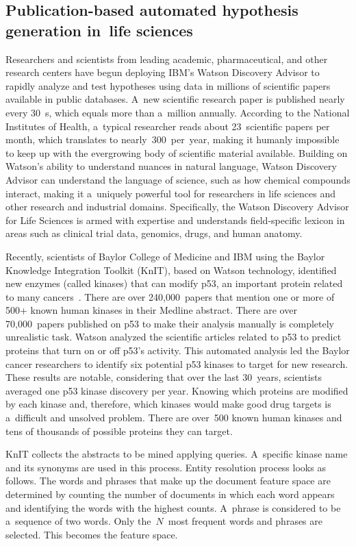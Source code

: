 \begin{multicols}{2}
\subsection{Publication-based automated hypothesis generation in~life sciences}

  \noindent
  Researchers and scientists from leading academic, pharmaceutical, and other
research centers have begun deploying  IBM's  Watson Discovery Advisor to rapidly
analyze and test hypotheses using data in millions of scientific papers available in
public databases. A~new scientific research paper is published nearly every
30~s, which equals more than a~million annually. According to the National
Institutes of Health, a~typical researcher reads about 23~scientific papers per month,
which translates to nearly~300~per~year, making it humanly impossible to keep up
with the evergrowing body of scientific material available. Building on Watson's
ability to understand nuances in natural language, Watson Discovery Advisor can
understand the language of science, such as how chemical compounds interact,
making it a~uniquely powerful tool for researchers in life sciences and other research
and industrial domains.  Specifically, the Watson Discovery Advisor for Life Sciences
is armed with expertise and understands field-specific lexicon in areas such as
clinical trial data, genomics, drugs, and human anatomy.

  Recently, scientists of Baylor College of Medicine and IBM using the Baylor
Knowledge Integration Toolkit (KnIT), based on Watson technology, identified new
enzymes (called kinases) that can modify p53, an important protein related to many
cancers~\cite{77-kl}. There are over 240,000~papers that mention one or more of
500+ known human kinases in their Medline abstract. There are over 70,000~papers
published on p53 to make their analysis manually is completely unrealistic task.
Watson analyzed the scientific articles related to p53 to predict proteins that turn on
or off p53's activity. This automated analysis led the Baylor cancer researchers to
identify six potential p53 kinases to target for new research. These results are notable,
considering that over the last 30~years, scientists averaged one p53 kinase discovery
per year. Knowing which proteins are modified by each kinase and, therefore, which
kinases would make good drug targets is a~difficult and unsolved problem. There are
over~500 known human kinases and tens of thousands of possible proteins they can
target.

  KnIT collects the abstracts to be mined applying queries. A~specific kinase name
and its synonyms are used in this process. Entity resolution process looks as follows.
The words and phrases that make up the document feature space are determined by
counting the number of documents in which each word appears and identifying the
words with the highest counts.  A~phrase is considered to be a~sequence of two
words. Only the~$N$~most frequent words and phrases are selected. This becomes the
feature space.


\end{multicols}
